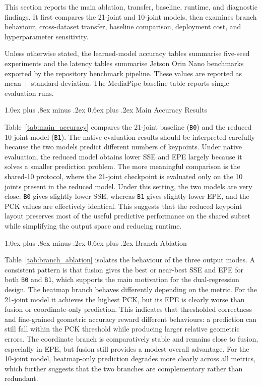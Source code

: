 \documentclass[10pt,letterpaper,twocolumn]{article}
\makeatletter
\renewcommand\subsection{\@startsection{subsection}{2}{\z@}%
  {1.0ex plus .8ex minus .2ex}%
  {0.6ex plus .2ex}%
  {\normalfont\itshape}}
\makeatother
\begin{document}
This section reports the main ablation, transfer, baseline, runtime, and diagnostic findings. It first compares the 21-joint and 10-joint models, then examines branch behaviour, cross-dataset transfer, baseline comparison, deployment cost, and hyperparameter sensitivity.

Unless otherwise stated, the learned-model accuracy tables summarise five-seed experiments and the latency tables summarise Jetson Orin Nano benchmarks exported by the repository benchmark pipeline. These values are reported as mean $\pm$ standard deviation. The MediaPipe baseline table reports single evaluation runs.

\subsection{Main Accuracy Results}

Table~\ref{tab:main_accuracy} compares the 21-joint baseline (\texttt{B0}) and the reduced 10-joint model (\texttt{B1}). The native evaluation results should be interpreted carefully because the two models predict different numbers of keypoints. Under native evaluation, the reduced model obtains lower SSE and EPE largely because it solves a smaller prediction problem. The more meaningful comparison is the shared-10 protocol, where the 21-joint checkpoint is evaluated only on the 10 joints present in the reduced model. Under this setting, the two models are very close: \texttt{B0} gives slightly lower SSE, whereas \texttt{B1} gives slightly lower EPE, and the PCK values are effectively identical. This suggests that the reduced keypoint layout preserves most of the useful predictive performance on the shared subset while simplifying the output space and reducing runtime.

\subsection{Branch Ablation}

Table~\ref{tab:branch_ablation} isolates the behaviour of the three output modes. A consistent pattern is that fusion gives the best or near-best SSE and EPE for both \texttt{B0} and \texttt{B1}, which supports the main motivation for the dual-regression design. The heatmap branch behaves differently depending on the metric. For the 21-joint model it achieves the highest PCK, but its EPE is clearly worse than fusion or coordinate-only prediction. This indicates that thresholded correctness and fine-grained geometric accuracy reward different behaviours: a prediction can still fall within the PCK threshold while producing larger relative geometric errors. The coordinate branch is comparatively stable and remains close to fusion, especially in EPE, but fusion still provides a modest overall advantage. For the 10-joint model, heatmap-only prediction degrades more clearly across all metrics, which further suggests that the two branches are complementary rather than redundant.
\end{document}
